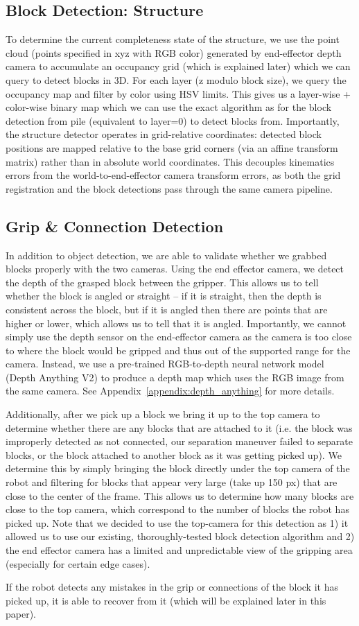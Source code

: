 \subsection{Block Detection: Structure}
To determine the current completeness state of the structure, we use the point cloud (points specified in xyz with RGB color) generated by end-effector depth camera to accumulate an occupancy grid (which is explained later) which we can query to detect blocks in 3D. For each layer (z modulo block size), we query the occupancy map and filter by color using HSV limits. This gives us a layer-wise + color-wise binary map which we can use the exact algorithm as for the block detection from pile (equivalent to layer=0) to detect blocks from. Importantly, the structure detector operates in grid-relative coordinates: detected block positions are mapped relative to the base grid corners (via an affine transform matrix) rather than in absolute world coordinates. This decouples kinematics errors from the world-to-end-effector camera transform errors, as both the grid registration and the block detections pass through the same camera pipeline.

\subsection{Grip \& Connection Detection}
In addition to object detection, we are able to validate whether we grabbed blocks properly with the two cameras. Using the end effector camera, we detect the depth of the grasped block between the gripper. This allows us to tell whether the block is angled or straight -- if it is straight, then the depth is consistent across the block, but if it is angled then there are points that are higher or lower, which allows us to tell that it is angled. Importantly, we cannot simply use the depth sensor on the end-effector camera as the camera is too close to where the block would be gripped and thus out of the supported range for the camera. Instead, we use a pre-trained RGB-to-depth neural network model (Depth Anything V2) to produce a depth map which uses the RGB image from the same camera. See Appendix~\ref{appendix:depth_anything} for more details.

\noindent Additionally, after we pick up a block we bring it up to the top camera to determine whether there are any blocks that are attached to it (i.e. the block was improperly detected as not connected, our separation maneuver failed to separate blocks, or the block attached to another block as it was getting picked up). We determine this by simply bringing the block directly under the top camera of the robot and filtering for blocks that appear very large (take up 150 px) that are close to the center of the frame. This allows us to determine how many blocks are close to the top camera, which correspond to the number of blocks the robot has picked up. Note that we decided to use the top-camera for this detection as 1) it allowed us to use our existing, thoroughly-tested block detection algorithm and 2) the end effector camera has a limited and unpredictable view of the gripping area (especially for certain edge cases).

\noindent If the robot detects any mistakes in the grip or connections of the block it has picked up, it is able to recover from it (which will be explained later in this paper).
